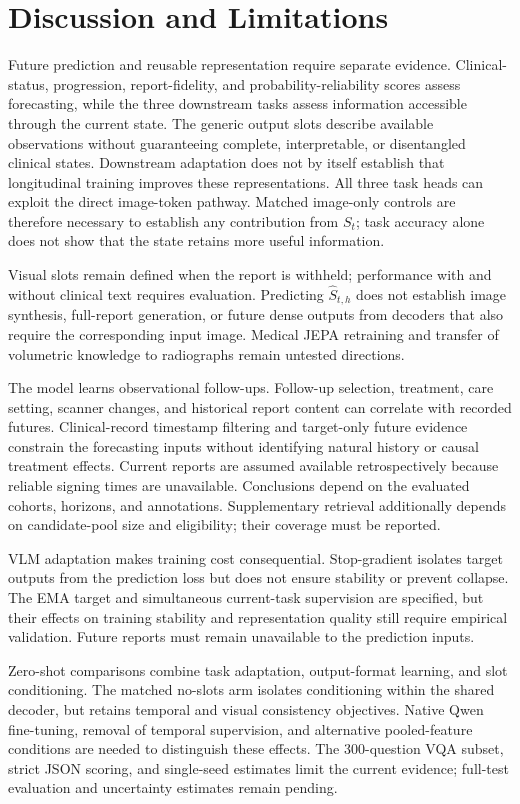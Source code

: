\section{Discussion and Limitations}
\label{sec:discussion}

Future prediction and reusable representation require separate evidence. Clinical-status, progression, report-fidelity, and probability-reliability scores assess forecasting, while the three downstream tasks assess information accessible through the current state. The generic output slots describe available observations without guaranteeing complete, interpretable, or disentangled clinical states. Downstream adaptation does not by itself establish that longitudinal training improves these representations. All three task heads can exploit the direct image-token pathway. Matched image-only controls are therefore necessary to establish any contribution from $S_t$; task accuracy alone does not show that the state retains more useful information.

Visual slots remain defined when the report is withheld; performance with and without clinical text requires evaluation. Predicting $\widehat S_{t,h}$ does not establish image synthesis, full-report generation, or future dense outputs from decoders that also require the corresponding input image. Medical JEPA retraining and transfer of volumetric knowledge to radiographs remain untested directions.

The model learns observational follow-ups. Follow-up selection, treatment, care setting, scanner changes, and historical report content can correlate with recorded futures. Clinical-record timestamp filtering and target-only future evidence constrain the forecasting inputs without identifying natural history or causal treatment effects. Current reports are assumed available retrospectively because reliable signing times are unavailable. Conclusions depend on the evaluated cohorts, horizons, and annotations. Supplementary retrieval additionally depends on candidate-pool size and eligibility; their coverage must be reported.

VLM adaptation makes training cost consequential. Stop-gradient isolates target outputs from the prediction loss but does not ensure stability or prevent collapse. The EMA target and simultaneous current-task supervision are specified, but their effects on training stability and representation quality still require empirical validation. Future reports must remain unavailable to the prediction inputs.

Zero-shot comparisons combine task adaptation, output-format learning, and slot conditioning. The matched no-slots arm isolates conditioning within the shared decoder, but retains temporal and visual consistency objectives. Native Qwen fine-tuning, removal of temporal supervision, and alternative pooled-feature conditions are needed to distinguish these effects. The 300-question VQA subset, strict JSON scoring, and single-seed estimates limit the current evidence; full-test evaluation and uncertainty estimates remain pending.
